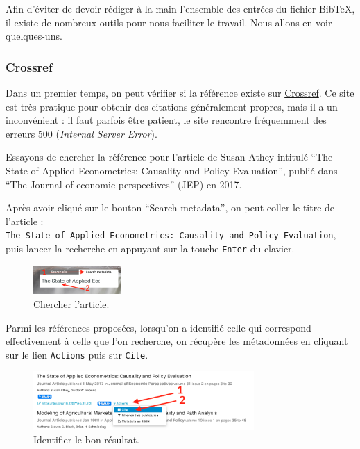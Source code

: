 \documentclass[
  11pt,
]{book}
\numberwithin{equation}{section}
\numberwithin{countremarque}{section}
\begin{document}
Afin d'éviter de devoir rédiger à la main l'ensemble des entrées du fichier BibTeX, il existe de nombreux outils pour nous faciliter le travail. Nous allons en voir quelques-uns.

\hypertarget{crossref}{%
\subsubsection{Crossref}\label{crossref}}

Dans un premier temps, on peut vérifier si la référence existe sur \href{https://www.crossref.org/}{Crossref}. Ce site est très pratique pour obtenir des citations généralement propres, mais il a un inconvénient : il faut parfois être patient, le site rencontre fréquemment des erreurs 500 (\emph{Internal Server Error}).

Essayons de chercher la référence pour l'article de Susan Athey intitulé ``The State of Applied Econometrics: Causality and Policy Evaluation'', publié dans ``The Journal of economic perspectives'' (JEP) en 2017.

Après avoir cliqué sur le bouton ``Search metadata'', on peut coller le titre de l'article : \texttt{The\ State\ of\ Applied\ Econometrics:\ Causality\ and\ Policy\ Evaluation}, puis lancer la recherche en appuyant sur la touche \texttt{Enter} du clavier.

\begin{figure}
\centering
\includegraphics[width=0.3\textwidth,height=\textheight]{figs/crossref_01.png}
\caption{Chercher l'article.}
\end{figure}

Parmi les références proposées, lorsqu'on a identifié celle qui correspond effectivement à celle que l'on recherche, on récupère les métadonnées en cliquant sur le lien \texttt{Actions} puis sur \texttt{Cite}.

\begin{figure}
\centering
\includegraphics[width=0.75\textwidth,height=\textheight]{figs/crossref_02.png}
\caption{Identifier le bon résultat.}
\end{figure}
\end{document}
